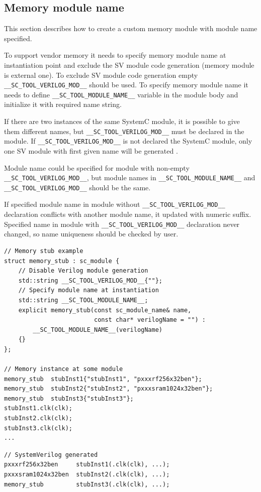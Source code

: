 \subsection{Memory module name}

This section describes how to create a custom memory module with module name specified. 

To support vendor memory it needs to specify memory module name at instantiation point and exclude the SV module code generation (memory module is external one). To exclude SV module code generation empty {\tt \_\_SC\_TOOL\_VERILOG\_MOD\_\_} should be used. To specify memory module name it needs to define {\tt \_\_SC\_TOOL\_MODULE\_NAME\_\_} variable in the module body and initialize it with required name string.

If there are two instances of the same SystemC module, it is possible to give them different names, but {\tt \_\_SC\_TOOL\_VERILOG\_MOD\_\_} must be declared in the module. If {\tt \_\_SC\_TOOL\_VERILOG\_MOD\_\_} is not declared the SystemC module, only one SV module with first given name will be generated . 

Module name could be specified for module with non-empty {\tt \_\_SC\_TOOL\_VERILOG\_MOD\_\_}, but module names in {\tt \_\_SC\_TOOL\_MODULE\_NAME\_\_} and {\tt \_\_SC\_TOOL\_VERILOG\_MOD\_\_} should be the same.

If specified module name in module without {\tt \_\_SC\_TOOL\_VERILOG\_MOD\_\_} declaration conflicts with another module name, it updated with numeric suffix. Specified name in module with {\tt \_\_SC\_TOOL\_VERILOG\_MOD\_\_}  declaration never changed, so name uniqueness should be checked by user.

\begin{lstlisting}[style=mycpp]
// Memory stub example
struct memory_stub : sc_module {
    // Disable Verilog module generation
    std::string __SC_TOOL_VERILOG_MOD__{""};
    // Specify module name at instantiation
    std::string __SC_TOOL_MODULE_NAME__;             
    explicit memory_stub(const sc_module_name& name,
                         const char* verilogName = "") :
        __SC_TOOL_MODULE_NAME__(verilogName)
    {}
};

// Memory instance at some module
memory_stub  stubInst1{"stubInst1", "pxxxrf256x32ben"};
memory_stub  stubInst2{"stubInst2", "pxxxsram1024x32ben"};
memory_stub  stubInst3{"stubInst3"};
stubInst1.clk(clk); 
stubInst2.clk(clk); 
stubInst3.clk(clk); 
...
\end{lstlisting}
%
\begin{lstlisting}[style=mycpp]
// SystemVerilog generated 
pxxxrf256x32ben     stubInst1(.clk(clk), ...);
pxxxsram1024x32ben  stubInst2(.clk(clk), ...);
memory_stub         stubInst3(.clk(clk), ...);
\end{lstlisting}


